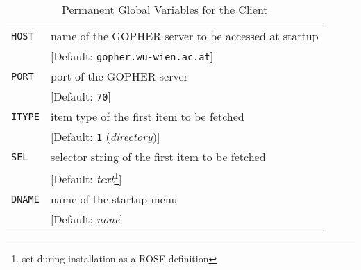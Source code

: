 \begin{table}
\caption{Permanent Global Variables for the Client}\label{clglv}
\rule{0mm}{2mm}
\begin{center}
\begin{minipage}{\textwidth}
\begin{tabular}{|l|l|}
\hline  %
{\tt HOST}      & name of the GOPHER server to be accessed at startup       \\
                & [Default: {\tt gopher.wu-wien.ac.at}]                     \\
\hline %
{\tt PORT}      & port of the GOPHER server                                 \\
                & [Default: {\tt 70}]                                       \\
\hline %
{\tt ITYPE}     & item type of the first item to be fetched                 \\
                & [Default: {\tt 1} ({\sl directory})]                      \\
\hline %
{\tt SEL}       & selector string of the first item to be fetched           \\
                & [Default: {\sl text}\footnote{set during installation
                  as a ROSE definition}]                                    \\
\hline %
{\tt DNAME}     & name of the startup menu                                  \\
                & [Default: {\sl none}]                                     \\

\end{tabular}
\end{minipage}
\end{center}
\end{table}
